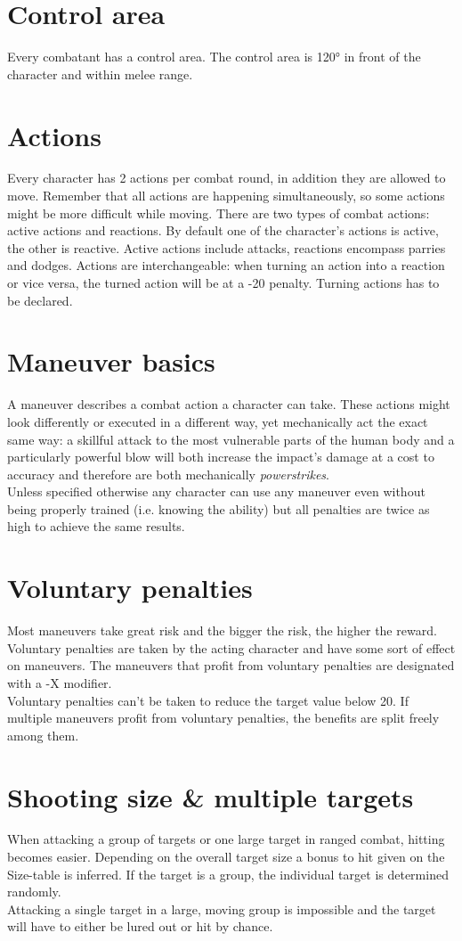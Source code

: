\documentclass[12pt,a4paper,openany]{book}
\begin{document}
	\section{Control area}
	Every combatant has a control area. The control area is 120° in front of the character and within melee range.
	\section{Actions}
	Every character has 2 actions per combat round, in addition they are allowed to move. Remember that all actions are happening simultaneously, so some actions might be more difficult while moving.
	There are two types of combat actions: active actions and reactions. By default one of the character’s actions is active, the other is reactive. Active actions include attacks, reactions encompass parries and dodges. Actions are interchangeable: when turning an action into a reaction or vice versa, the turned action will be at a -20 penalty. Turning actions has to be declared.
	\section{Maneuver basics}
	A maneuver describes a combat action a character can take. These actions might look differently or executed in a different way, yet mechanically act the exact same way: a skillful attack to the most vulnerable parts of the human body and a particularly powerful blow will both increase the impact’s damage at a cost to accuracy and therefore are both mechanically \textit{powerstrikes}.\\
	Unless specified otherwise any character can use any maneuver even without being properly trained (i.e. knowing the ability) but all penalties are twice as high to achieve the same results.
	\section{Voluntary penalties}
	Most maneuvers take great risk and the bigger the risk, the higher the reward. Voluntary penalties are taken by the acting character and have some sort of effect on maneuvers. The maneuvers that profit from voluntary penalties are designated with a -X modifier.\\
	Voluntary penalties can’t be taken to reduce the target value below 20. If multiple maneuvers profit from voluntary penalties, the benefits are split freely among them.
	\section{Shooting size \& multiple targets}
	When attacking a group of targets or one large target in ranged combat, hitting becomes easier. Depending on the overall target size a bonus to hit given on the Size-table is inferred. If the target is a group, the individual target is determined randomly.\\
	Attacking a single target in a large, moving group is impossible and the target will have to either be lured out or hit by chance.
\end{document}
